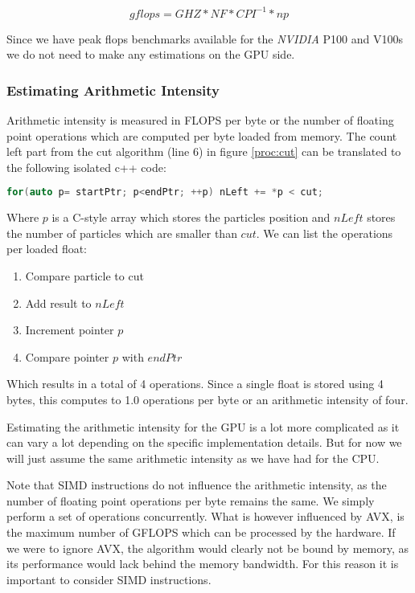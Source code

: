 \documentclass[]{article}
\begin{document}
\begin{center}
	\begin{equation}
		gflops = GHZ * NF * CPI^{-1} * np
	\end{equation}
\label{eq:avx}
\end{center}

Since we have peak flops benchmarks available for the \textit{NVIDIA} P100 and V100s we do not need to make any estimations on the GPU side.

\subsubsection{Estimating Arithmetic Intensity}

Arithmetic intensity is measured in FLOPS per byte or the number of floating point operations which are computed per byte loaded from memory. The count left part from the cut algorithm (line 6) in figure \ref{proc:cut} can be translated to the following isolated c++ code:

\begin{lstlisting}[language=c++, caption=Counting the particles left of a cut plane, label=Minimal Count Left C++]
	for(auto p= startPtr; p<endPtr; ++p) nLeft += *p < cut;
\end{lstlisting}

Where $p$ is a C-style array which stores the particles position and $nLeft$ stores the number of particles which are smaller than $cut$. We can list the operations per loaded float:

\begin{enumerate}
	\item Compare particle to cut
	\item Add result to $nLeft$
	\item Increment pointer $p$
	\item Compare pointer $p$ with $endPtr$
\end{enumerate}

Which results in a total of 4 operations. Since a single float is stored using 4 bytes, this computes to 1.0 operations per byte or an arithmetic intensity of four. 

Estimating the arithmetic intensity for the GPU is a lot more complicated as it can vary a lot depending on the specific implementation details. But for now we will just assume the same arithmetic intensity as we have had for the CPU.

Note that SIMD instructions do not influence the arithmetic intensity, as the number of floating point operations per byte remains the same. We simply perform a set of operations concurrently. What is however influenced by AVX, is the maximum number of GFLOPS which can be processed by the hardware. If we were to ignore AVX, the algorithm would clearly not be bound by memory, as its performance would lack behind the memory bandwidth. For this reason it is important to consider SIMD instructions.
\end{document}
